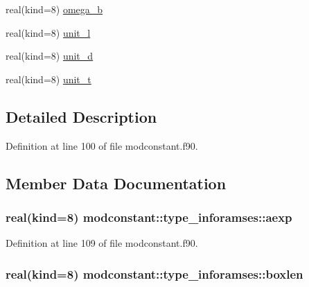 \begin{DoxyCompactItemize}
\item 
real(kind=8) \hyperlink{structmodconstant_1_1type__inforamses_a1a5ae70e575367446fa1a0b9346d8d62}{omega\+\_\+b}
\item 
real(kind=8) \hyperlink{structmodconstant_1_1type__inforamses_a6f87e3e1bebd53aa16cbc67b1a47ad80}{unit\+\_\+l}
\item 
real(kind=8) \hyperlink{structmodconstant_1_1type__inforamses_a9bec2e4699094994b6802b7a63223c20}{unit\+\_\+d}
\item 
real(kind=8) \hyperlink{structmodconstant_1_1type__inforamses_a476201b699ccd42e319364d8975a9293}{unit\+\_\+t}
\end{DoxyCompactItemize}


\subsection{Detailed Description}


Definition at line 100 of file modconstant.\+f90.



\subsection{Member Data Documentation}
\subsubsection[{\texorpdfstring{aexp}{aexp}}]{\setlength{\rightskip}{0pt plus 5cm}real(kind=8) modconstant\+::type\+\_\+inforamses\+::aexp}\hypertarget{structmodconstant_1_1type__inforamses_a7e17a5532f8e65c4977fb71a8379006c}{}\label{structmodconstant_1_1type__inforamses_a7e17a5532f8e65c4977fb71a8379006c}


Definition at line 109 of file modconstant.\+f90.

\subsubsection[{\texorpdfstring{boxlen}{boxlen}}]{\setlength{\rightskip}{0pt plus 5cm}real(kind=8) modconstant\+::type\+\_\+inforamses\+::boxlen}\hypertarget{structmodconstant_1_1type__inforamses_a836fde885c81b3643ee595c9eb63b19e}{}\label{structmodconstant_1_1type__inforamses_a836fde885c81b3643ee595c9eb63b19e}


